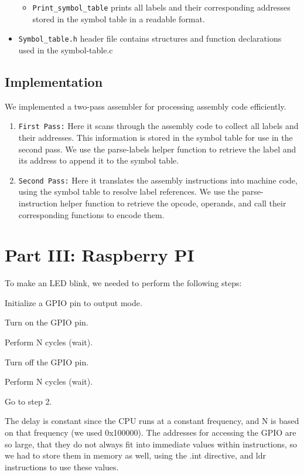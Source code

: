 \documentclass[11pt]{article}
\begin{document}
\begin{itemize}
\begin{itemize}
        \item \verb|Print_symbol_table| prints all labels and their corresponding addresses stored in the symbol table in a readable format.

        \end{itemize}

    \item \verb|Symbol_table.h| header file contains structures and function declarations used in the symbol-table.c

    \end{itemize}
    
\subsection{Implementation}
We implemented a two-pass assembler for processing assembly code efficiently.
\begin{enumerate}
\item \verb|First Pass:| Here it scans through the assembly code to collect all labels and their addresses. This information is stored in the symbol table for use in the second pass. We use the parse-labels helper function to retrieve the label and its address to append it to the symbol table.

\item \verb|Second Pass:| Here it translates the assembly instructions into machine code, using the symbol table to resolve label references. We use the parse-instruction helper function to retrieve the opcode, operands, and call their corresponding functions to encode them.

\end{enumerate}

\section{Part III: Raspberry PI}
To make an LED blink, we needed to perform the following steps:
\begin{enumerate}
\small{
\item Initialize a GPIO pin to output mode.
\item Turn on the GPIO pin.
\item Perform N cycles (wait).
\item Turn off the GPIO pin.
\item Perform N cycles (wait).
\item Go to step 2.
}
\end{enumerate}
The delay is constant since the CPU runs at a constant frequency, and N is based on that frequency (we used 0x100000). The addresses for accessing the GPIO are so large, that they do not always fit into immediate values within instructions, so we had to store them in memory as well, using the .int directive, and ldr instructions to use these values.
\end{document}
